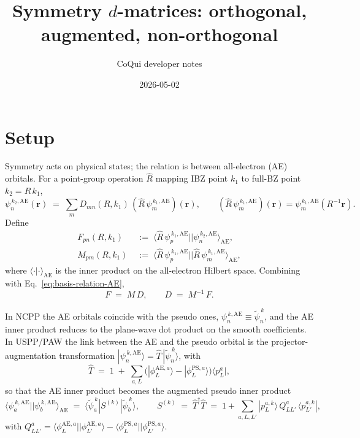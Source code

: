 \documentclass[11pt]{article}
\title{Symmetry $d$-matrices: orthogonal, augmented, non-orthogonal}
\author{CoQui developer notes}
\date{2026-05-02}
\newcommand{\bra}[1]{\langle #1 |}
\newcommand{\ket}[1]{| #1 \rangle}
\newcommand{\matel}[3]{\langle #1 | #2 | #3 \rangle}
\newcommand{\AEt}{\mathrm{AE}}
\newcommand{\rotpsiAE}[2]{\hat{R}\,\psi_{#1}^{\,#2,\AEt}}
\newcommand{\psiAE}[2]{\psi_{#1}^{\,#2,\AEt}}
\newcommand{\psipt}[2]{\widetilde{\psi}_{#1}^{\,#2}}
\begin{document}
\maketitle

\section*{Setup}

Symmetry acts on physical states; the relation is between
all-electron (AE) orbitals. For a point-group operation $\hat{R}$
mapping IBZ point $k_1$ to full-BZ point $k_2 = R\,k_1$,
\begin{equation}
  \psiAE{n}{k_2}(\mathbf{r})
  \;=\; \sum_{m} D_{mn}(R, k_1)\,
        (\hat{R}\,\psiAE{m}{k_1})(\mathbf{r}),
  \qquad
  (\hat{R}\,\psiAE{m}{k_1})(\mathbf{r})
  = \psiAE{m}{k_1}(R^{-1}\mathbf{r}).
  \label{eq:basis-relation-AE}
\end{equation}
Define
\begin{align}
  F_{pn}(R, k_1) &\;:=\; \matel{\rotpsiAE{p}{k_1}}{}{\psiAE{n}{k_2}}_{\AEt},
  \\
  M_{pm}(R, k_1) &\;:=\; \matel{\rotpsiAE{p}{k_1}}{}{\rotpsiAE{m}{k_1}}_{\AEt},
\end{align}
where $\langle\cdot|\cdot\rangle_{\AEt}$ is the inner product on the
all-electron Hilbert space. Combining with
Eq.~\eqref{eq:basis-relation-AE},
\begin{equation}
  F \;=\; M\,D, \qquad
  D \;=\; M^{-1}\,F.
  \label{eq:master}
\end{equation}

In NCPP the AE orbitals coincide with the pseudo ones,
$\psiAE{n}{k} \equiv \psipt{n}{k}$, and the AE inner product reduces
to the plane-wave dot product on the smooth coefficients. In USPP/PAW
the link between the AE and the pseudo orbital is the
projector-augmentation transformation
$\ket{\psiAE{n}{k}} = \widehat{T}\,\ket{\psipt{n}{k}}$, with
\begin{equation}
  \widehat{T}
  \;=\; 1 \;+\; \sum_{a,L}
        \big(\ket{\phi_L^{\AEt,a}} - \ket{\phi_L^{\mathrm{PS},a}}\big)
        \bra{p_L^{a}},
\end{equation}
so that the AE inner product becomes the augmented pseudo inner
product
\begin{equation}
  \matel{\psiAE{a}{k}}{}{\psiAE{b}{k}}_{\AEt}
  \;=\; \matel{\psipt{a}{k}}{S^{(k)}}{\psipt{b}{k}},
  \qquad
  S^{(k)} \;=\; \widehat{T}^{\dagger}\widehat{T}
  \;=\; 1 + \sum_{a,L,L'} \ket{p_L^{a,k}}\,Q^a_{LL'}\,\bra{p_{L'}^{a,k}},
  \label{eq:S-aug}
\end{equation}
with $Q^a_{LL'} = \matel{\phi_L^{\AEt,a}}{}{\phi_{L'}^{\AEt,a}}
- \matel{\phi_L^{\mathrm{PS},a}}{}{\phi_{L'}^{\mathrm{PS},a}}$.
\end{document}
